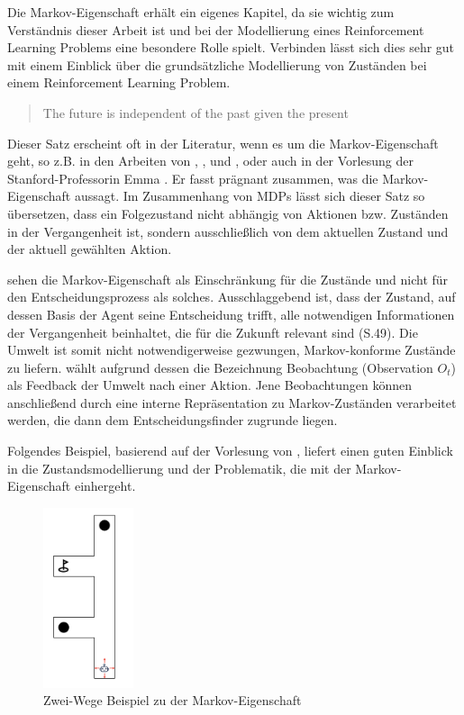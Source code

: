 Die Markov-Eigenschaft erhält ein eigenes Kapitel, da sie wichtig zum Verständnis dieser Arbeit ist und bei der Modellierung eines Reinforcement Learning Problems eine besondere Rolle spielt. Verbinden lässt sich dies sehr gut mit einem Einblick über die grundsätzliche Modellierung von Zuständen bei einem Reinforcement Learning Problem.

\begin{quote}
    The future is independent of the past given the present
  \end{quote}

Dieser Satz erscheint oft in der Literatur, wenn es um die Markov-Eigenschaft geht, so z.B. in den Arbeiten von \cite{Feldman2010}, \cite{kumar2014markov}, \cite{capela2019monogamy} und \cite{SaulMarkov}, oder auch in der Vorlesung der Stanford-Professorin Emma \cite{Brunskill}. Er fasst prägnant zusammen, was die Markov-Eigenschaft aussagt. Im Zusammenhang von MDPs lässt sich dieser Satz so übersetzen, dass ein Folgezustand nicht abhängig von Aktionen bzw. Zuständen in der Vergangenheit ist, sondern ausschließlich von dem aktuellen Zustand und der aktuell gewählten Aktion.
\par 
\cite{Sutton1998} sehen die Markov-Eigenschaft als Einschränkung für die Zustände und nicht für den Entscheidungsprozess als solches. 
Ausschlaggebend ist, dass der Zustand, auf dessen Basis der Agent seine Entscheidung trifft, alle notwendigen Informationen der Vergangenheit beinhaltet, die für die Zukunft relevant sind (S.49).
Die Umwelt ist somit nicht notwendigerweise gezwungen, Markov-konforme Zustände zu liefern. \cite{Brunskill} wählt aufgrund dessen die Bezeichnung \glqq Beobachtung\grqq{} (Observation $O_t$) als Feedback der Umwelt nach einer Aktion. Jene Beobachtungen können anschließend durch eine interne Repräsentation zu Markov-Zuständen verarbeitet werden, die dann dem Entscheidungsfinder zugrunde liegen.
\par
Folgendes Beispiel, basierend auf der Vorlesung von \cite{Brunskill}, liefert einen guten Einblick in die Zustandsmodellierung und der Problematik, die mit der Markov-Eigenschaft einhergeht.
\par 
\begin{figure}[H]
  \centering
  \includegraphics[height=200px]{images/2passagesDefault.png}
  \caption{ Zwei-Wege Beispiel zu der Markov-Eigenschaft}
  \label{fig:2-Wege-1}
\end{figure}

